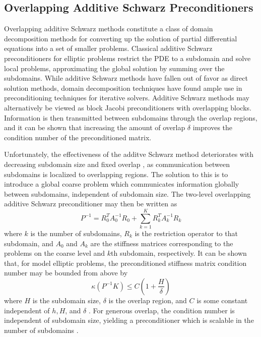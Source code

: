 
\subsection{Overlapping Additive Schwarz Preconditioners}

Overlapping additive Schwarz methods constitute a class of domain decomposition methods for converting up the solution of partial differential equations into a set of smaller problems.  Classical additive Schwarz preconditioners for elliptic problems restrict the PDE to a subdomain and solve local problems, approximating the global solution by summing over the subdomains.  While additive Schwarz methods have fallen out of favor as direct solution methods, domain decomposition techniques have found ample use in preconditioning techniques for iterative solvers.  Additive Schwarz methods may alternatively be viewed as block Jacobi preconditioners with overlapping blocks.  Information is then transmitted between subdomains through the overlap regions, and it can be shown that increasing the amount of overlap $\delta$ improves the condition number of the preconditioned matrix.  

Unfortunately, the effectiveness of the additve Schwarz method deteriorates with decreasing subdomain size and fixed overlap \cite{bjorstad2004domain, toselli2005domain}, as communication between subdomains is localized to overlapping regions.  The solution to this is to introduce a global coarse problem which communicates information globally between subdomains, independent of subdomain size.  The two-level overlapping additive Schwarz preconditioner \cite{dryja1987additive} may then be written as
\[
P^{-1} = R_0^T A_0^{-1} R_0 + \sum_{k = 1}^K R_k^T A_k^{-1} R_k
\]
where $k$ is the number of subdomains, $R_k$ is the restriction operator to that subdomain, and $A_0$ and $A_k$ are the stiffness matrices corresponding to the problems on the coarse level and $k$th subdomain, respectively.  It can be shown that, for model elliptic problems, the preconditioned stiffness matrix condition number may be bounded from above by
\[
\kappa(P^{-1}K) \leq C\left(1 + \frac{H}{\delta}\right)
\]
where $H$ is the subdomain size, $\delta$ is the overlap region, and $C$ is some constant independent of $h, H$, and $\delta$ \cite{dryja1994schwarz}.  For generous overlap, the condition number is independent of subdomain size, yielding a preconditioner which is scalable in the number of subdomains \cite{chan1996overlapping}.  

